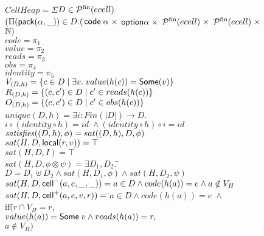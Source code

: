 \begin{figure}
\mbox{}
\begin{tabbing}
$CellHeap = \Sigma$\=$ D \in \mathcal{P}^{\mathrm{fin}}(ecell).$ \\
               \>$(\Pi (\mathsf{pack}({\alpha}, {\_})) \in D. ($\=${\mathsf{code}\;{\alpha}} \;\times$
                                         ${\mathsf{option }{\alpha}} \;\times$ 
                                         ${\mathcal{P}^{\mathrm{fin}}(ecell)} \;\times$ 
                                         ${\mathcal{P}^{\mathrm{fin}}(ecell)} \;\times$ 
                                         $\mathbb{N})$ \\[1em]
       

$code = \pi_1$ \\
$value = \pi_2$ \\
$reads = \pi_3$ \\
$obs = \pi_4$ \\
$identity = \pi_5$ \\[1em]

$V_{(D, h)} = \{{{c \in D}\;|\;{\exists v.\; value(h(c)) = \mathsf{Some}(v)}}\}$ \\
$R_{(D, h)} = \{{{(c,c') \in D}\;|\;{ c' \in reads(h(c)) }}\}$ \\
$O_{(D, h)} = \{{{(c,c') \in D}\;|\;{ c' \in obs(h(c)) }}\}$ \\[1em]

$unique(D,h) = \exists$\=$i : Fin(|D|) \to D.$\\
                       \>$i \circ (identity \circ h) = id \; \land (identity \circ h) \circ i = id$ \\[1em]

$\mathit{satisfies}({(D,h)}, {\phi}) = sat((D,h), D, \phi)$ \\[1em]

$sat(H, D, \mathsf{local}({r}, {v})) = \top$ \\
$sat(H, D, I) = \top$ \\
$sat(H, D, \phi \otimes \psi) = \exists D_1, D_2.\;$\=$D = D_1 \uplus D_2 
                                                      \land sat(H, D_1, \phi) 
                                                      \land sat(H, D_2, \psi)$ \\
$sat(H, D, \mathsf{cell}^{-}({a}, {e}, {\_}, {\_})) = a \in D \land code(h(a)) = e \land a \not \in V_H$ \\
$sat(H, D, \mathsf{cell}^{+}({a}, {e}, {v}, {r})) =\; $\=$ a \in D \land code(h(a)) = e \;\land$ \\
      \>$\mathrm{if}($\=$r \cap V_H = r,$ \\
      \>     \>$value(h(a)) = \mathsf{Some}\;v \land reads(h(a)) = r,$ \\
      \>     \>$a \not\in V_H)$\\[1em]
 


\end{tabbing}
\end{figure}
